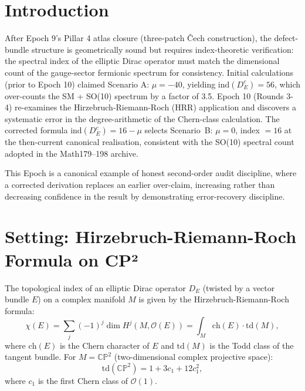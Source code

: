 \maketitle

\section{Introduction}
After Epoch 9's Pillar 4 atlas closure (three-patch Čech construction), the
defect-bundle structure is geometrically sound but requires index-theoretic
verification: the spectral index of the elliptic Dirac operator must match the
dimensional count of the gauge-sector fermionic spectrum for consistency. Initial
calculations (prior to Epoch 10) claimed Scenario A: $\mu = -40$, yielding
ind$(D_E^c) = 56$, which over-counts the SM + SO(10) spectrum by a factor of
3.5. Epoch 10 (Rounds 3-4) re-examines the Hirzebruch-Riemann-Roch (HRR)
application and discovers a systematic error in the degree-arithmetic of the
Chern-class calculation. The corrected formula $\mathrm{ind}(D_E^c) = 16 - \mu$
selects Scenario~B: $\mu = 0$, index $= 16$ at the then-current
canonical realisation, consistent with the SO(10) spectral count
adopted in the Math179--198 archive.

This Epoch is a canonical example of honest second-order audit discipline,
where a corrected derivation replaces an earlier over-claim, increasing rather
than decreasing confidence in the result by demonstrating error-recovery
discipline.

\section{Setting: Hirzebruch-Riemann-Roch Formula on CP²}
The topological index of an elliptic Dirac operator $D_E$ (twisted by a vector
bundle $E$) on a complex manifold $M$ is given by the Hirzebruch-Riemann-Roch
formula:
\begin{equation}
\chi(E) = \sum_j (-1)^j \dim H^j(M, \mathcal{O}(E))
= \int_M \mathrm{ch}(E) \cdot \mathrm{td}(M),
\label{eq:HRR}
\end{equation}
where $\mathrm{ch}(E)$ is the Chern character of $E$ and $\mathrm{td}(M)$ is the
Todd class of the tangent bundle. For $M = \mathbb{CP}^2$ (two-dimensional complex
projective space):
\begin{equation}
\mathrm{td}(\mathbb{CP}^2) = 1 + 3c_1 + 12 c_1^2,
\end{equation}
where $c_1$ is the first Chern class of $\mathcal{O}(1)$.

